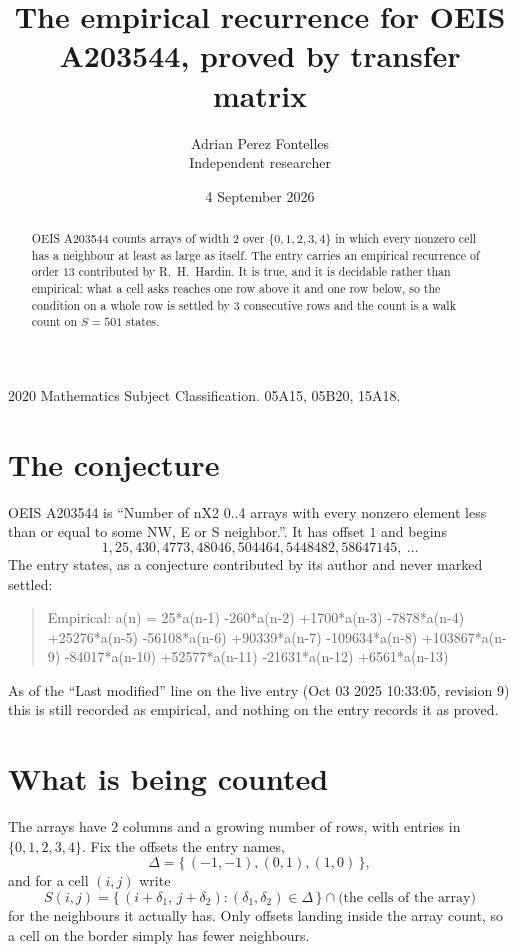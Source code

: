 \documentclass[11pt,a4paper]{article}
\title{The empirical recurrence for OEIS A203544, proved by transfer matrix}
\author{Adrian Perez Fontelles\\ \small Independent researcher}
\date{4 September 2026}
\theoremstyle{plain}
\theoremstyle{definition}
\begin{document}
\maketitle

\begin{abstract}
OEIS A203544 counts arrays of width $2$ over $\{0,1,2,3,4\}$ in which every nonzero cell has a neighbour at least as large as itself. The entry carries an
empirical recurrence of order $13$ contributed by R.~H.~Hardin. It is true, and it is
decidable rather than empirical: what a cell asks reaches one row above it and one row below, so the
condition on a whole row is settled by $3$ consecutive rows and the count is a walk
count on $S=501$ states.
\end{abstract}

\noindent\small 2020 Mathematics Subject Classification. 05A15, 05B20, 15A18.\normalsize

\section{The conjecture}

OEIS A203544 is ``Number of nX2 0..4 arrays with every nonzero element less than or equal to some NW, E or S neighbor.''. It has offset $1$ and begins
\[
1, 25, 430, 4773, 48046, 504464, 5448482, 58647145,\ \dots
\]
The entry states, as a conjecture contributed by its author and never marked settled:
\begin{quote}
Empirical: a(n) = 25*a(n-1) -260*a(n-2) +1700*a(n-3) -7878*a(n-4) +25276*a(n-5) -56108*a(n-6) +90339*a(n-7) -109634*a(n-8) +103867*a(n-9) -84017*a(n-10) +52577*a(n-11) -21631*a(n-12) +6561*a(n-13)
\end{quote}
As of the ``Last modified'' line on the live entry (Oct 03 2025 10:33:05, revision 9) this is still
recorded as empirical, and nothing on the entry records it as proved.

\section{What is being counted}

The arrays have $2$ columns and a growing number of rows, with entries in $\{0,1,2,3,4\}$. Fix the
offsets the entry names,
\[
\Delta=\{\,(-1,-1), (0,1), (1,0)\,\},
\]
and for a cell $(i,j)$ write
\[
S(i,j)=\{\,(i+\delta_1,\,j+\delta_2) : (\delta_1,\delta_2)\in\Delta\,\}\cap
\text{(the cells of the array)}
\]
for the neighbours it actually has. Only offsets landing inside the array count, so a cell on
the border simply has fewer neighbours.
\end{document}
